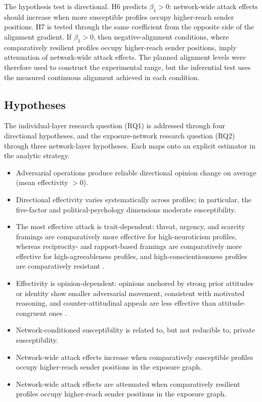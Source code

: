\documentclass[11pt,a4paper]{article}
\begin{document}
The hypothesis test is directional. H6 predicts \(\beta_1 > 0\): network-wide attack effects
should increase when more susceptible profiles occupy higher-reach sender positions. H7 is tested
through the same coefficient from the opposite side of the alignment gradient. If
\(\beta_1 > 0\), then negative-alignment conditions, where comparatively resilient profiles occupy
higher-reach sender positions, imply attenuation of network-wide attack effects. The planned
alignment levels were therefore used to construct the experimental range, but the inferential test
uses the measured continuous alignment achieved in each condition.

\subsection{Hypotheses}\label{sec:hypotheses}

The individual-layer research question (RQ1) is addressed through four directional hypotheses,
and the exposure-network research question (RQ2) through three network-layer hypotheses. Each maps
onto an explicit estimator in the analytic strategy.

\begin{itemize}[leftmargin=2.6em,itemsep=3pt]
\item[\textbf{H1.}] Adversarial operations produce reliable directional opinion change on average
(mean effectivity $> 0$).
\item[\textbf{H2.}] Directional effectivity varies systematically across profiles; in particular,
the five-factor and political-psychology dimensions moderate susceptibility.
\item[\textbf{H3.}] The most effective attack is trait-dependent: threat, urgency, and scarcity
framings are comparatively more effective for high-neuroticism profiles, whereas reciprocity- and
rapport-based framings are comparatively more effective for high-agreeableness profiles, and
high-conscientiousness profiles are comparatively resistant
\citep{lopezaguilar2025phishing,palmtims2025influence}.
\item[\textbf{H4.}] Effectivity is opinion-dependent: opinions anchored by strong prior attitudes
or identity show smaller adversarial movement, consistent with motivated reasoning, and
counter-attitudinal appeals are less effective than attitude-congruent ones
\citep{decker2023personality}.
\item[\textbf{H5.}] Network-conditioned susceptibility is related to, but not reducible to,
private susceptibility.
\item[\textbf{H6.}] Network-wide attack effects increase when comparatively susceptible profiles
occupy higher-reach sender positions in the exposure graph.
\item[\textbf{H7.}] Network-wide attack effects are attenuated when comparatively resilient
profiles occupy higher-reach sender positions in the exposure graph.
\end{itemize}
\end{document}

